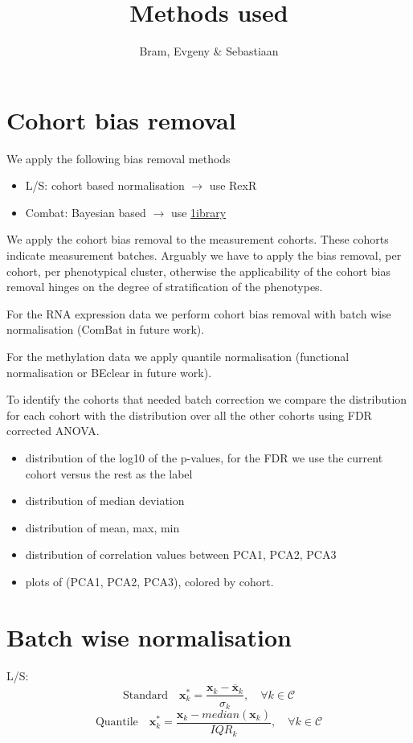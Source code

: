 \documentclass[a4paper,10pt]{article}
\title{Methods used}
\author{Bram, Evgeny \& Sebastiaan}
\begin{document}
\section{Cohort bias removal}
%
We apply the following bias removal methods
%
\begin{itemize}
\item L/S: cohort based normalisation $\rightarrow$ use RexR
\item Combat: Bayesian based $\rightarrow$ use \href{http://www.bu.edu/jlab/wp-assets/ComBat/Abstract.html}{1ibrary} 
\end{itemize}

We apply the cohort bias removal to the measurement cohorts. These cohorts indicate measurement batches.
%
Arguably we have to apply the bias removal, per cohort, per phenotypical cluster, otherwise
the applicability of the cohort bias removal hinges on the degree of stratification of the phenotypes.

For the RNA expression data we perform cohort bias removal with batch wise normalisation (ComBat in future work).

For the methylation data we apply quantile normalisation (functional normalisation or BEclear in future work).

To identify the cohorts that needed batch correction we compare the distribution for each cohort 
with the distribution over all the other cohorts using FDR corrected ANOVA.

\begin{itemize}
\item distribution of the log10 of the p-values, for the FDR we use the current cohort versus the rest as the label
\item distribution of median deviation
\item distribution of mean, max, min 
\item distribution of correlation values between PCA1, PCA2, PCA3
\item plots of (PCA1, PCA2, PCA3), colored by cohort.
\end{itemize}
%

\section{Batch wise normalisation}
%
L/S:
\begin{equation}
\mbox{Standard}\quad \mathbf{x}^*_k= \frac{\mathbf{x}_k-\overline{\mathbf{x}}_k}{\sigma_k},\quad \forall k\in \mathcal{C}
\end{equation}
\begin{equation}
\mbox{Quantile}\quad \mathbf{x}^*_k= \frac{\mathbf{x}_k-median{(\mathbf{x}_k)}}{IQR_k},\quad \forall k\in \mathcal{C}
\end{equation}
%
\end{document}
